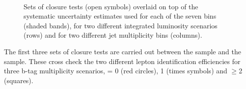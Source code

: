 \begin{figure}[h!]
\begin{center}
     \\
    \caption{Sets of closure tests (open symbols) overlaid on top of
      the systematic uncertainty estimates used for each of the seven
      \scalht bins (shaded bands), for two different integrated
      luminosity scenarios (rows) and for two different jet
      multiplicity bins (columns).}
    \label{fig:closure}
  \end{center} 
\end{figure}

The first three sets of closure tests are carried out between the \mj
sample and the \ej sample. These cross check the two different lepton
identification efficiencies for three b-tag multiplicity scenarios,
\njet = 0 (red circles), 1 (times symbols) and $\geq$2 (squares).

